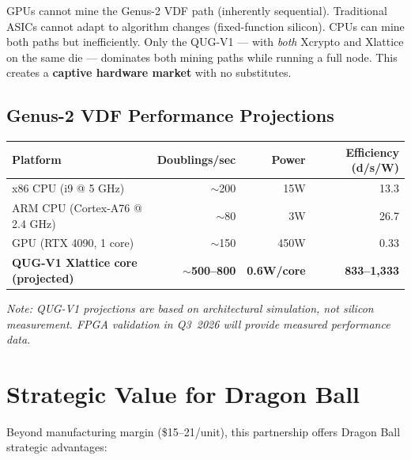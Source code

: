 \documentclass[11pt,a4paper]{article}
\begin{document}
\begin{highlight}
GPUs cannot mine the Genus-2 VDF path (inherently sequential). Traditional ASICs cannot adapt to algorithm changes (fixed-function silicon). CPUs can mine both paths but inefficiently. Only the QUG-V1 --- with \emph{both} Xcrypto and Xlattice on the same die --- dominates both mining paths while running a full node. This creates a \textbf{captive hardware market} with no substitutes.
\end{highlight}

\subsection{Genus-2 VDF Performance Projections}

\begin{center}
\begin{tabular}{@{}lrrr@{}}
\toprule
\textbf{Platform} & \textbf{Doublings/sec} & \textbf{Power} & \textbf{Efficiency (d/s/W)} \\
\midrule
x86 CPU (i9 @ 5 GHz) & $\sim$200 & 15W & 13.3 \\
ARM CPU (Cortex-A76 @ 2.4 GHz) & $\sim$80 & 3W & 26.7 \\
GPU (RTX 4090, 1 core) & $\sim$150 & 450W & 0.33 \\
\textbf{QUG-V1 Xlattice core (projected)} & \textbf{$\sim$500--800} & \textbf{0.6W/core} & \textbf{833--1,333} \\
\bottomrule
\end{tabular}
\end{center}

\textit{Note: QUG-V1 projections are based on architectural simulation, not silicon measurement. FPGA validation in Q3~2026 will provide measured performance data.}

\section{Strategic Value for Dragon Ball}

Beyond manufacturing margin (\$15--21/unit), this partnership offers Dragon Ball strategic advantages:
\end{document}
